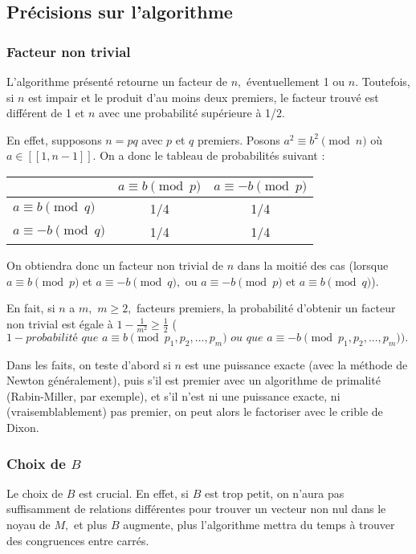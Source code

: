 \documentclass[french, 12pt, titlepage]{article}
\begin{document}
\subsection{Précisions sur l'algorithme}

\subsubsection{Facteur non trivial}

L'algorithme présenté retourne un facteur de $n,$ éventuellement 1 ou
$n.$ Toutefois, si $n$ est impair et le produit d'au moins deux
premiers, le facteur trouvé est différent de 1 et $n$ avec une
probabilité supérieure à 1/2. 

En effet, supposons $n = pq$ avec $p$ et $q$ premiers. Posons $a^2 \equiv b^2 \pmod n$
où $a \in [\![1, n-1]\!].$ On a donc le tableau de probabilités
suivant : 
\begin{center}
\begin{tabular}{l|c|c}
 & $a \equiv b \pmod p$ & $a \equiv -b \pmod p$ \\
\hline
$a \equiv b \pmod q$ & 1/4 & 1/4 \\
\hline
$a \equiv -b \pmod q$ & 1/4 & 1/4 \\
\end{tabular}
\end{center}
On obtiendra donc un facteur non trivial de $n$ dans la moitié des cas
(lorsque $a \equiv b \pmod p$ et $a \equiv -b \pmod q,$ ou $a \equiv -b \pmod p$ et $a \equiv b \pmod q$).

En fait, si $n$ a $m,$ $m \geq 2,$ facteurs premiers, la probabilité d'obtenir un
facteur non trivial est égale à $1 - \frac{1}{m^2} \geq \frac{1}{2}$
($1 - \textit{probabilité que } a \equiv b \pmod {p_1, p_2, ..., p_m} \textit{ ou que } a \equiv -b \pmod {p_1, p_2, ..., p_m}).$

Dans les faits, on teste d'abord si $n$ est une puissance exacte (avec la méthode de Newton généralement), puis s'il est premier avec un algorithme de primalité (Rabin-Miller, par
exemple), et s'il n'est ni une puissance exacte, ni (vraisemblablement) pas premier, on peut alors le
factoriser avec le crible de Dixon.


\subsubsection{Choix de $B$}

Le choix de $B$ est crucial. En effet, si $B$ est trop petit, on
n'aura pas suffisamment de relations différentes pour trouver un
vecteur non nul dans le noyau de $M,$ et plus $B$ augmente, plus
l'algorithme mettra du temps à trouver des congruences entre carrés. 
\end{document}
